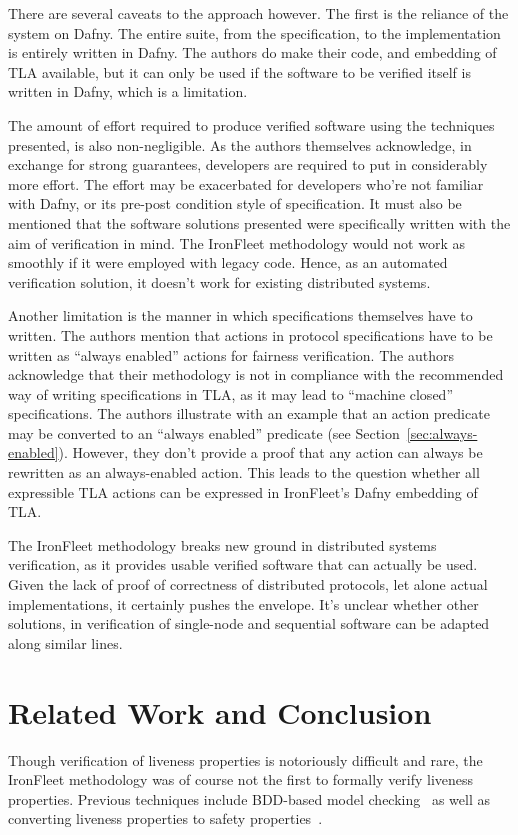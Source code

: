 \documentclass{llncs}
\begin{document}
There are several caveats to the approach however. The first is the reliance of the system on Dafny.
 The entire suite, from the specification, to the implementation is entirely written in Dafny. The 
 authors do make their code, and embedding of TLA available, but it can only be used if the software
 to be verified itself is written in Dafny, which is a limitation. 

 The amount of effort required to produce verified software using the techniques presented, is also 
 non-negligible. As the authors themselves acknowledge, in exchange for strong guarantees, developers
 are required to put in considerably more effort. The effort may be exacerbated for developers who're 
 not familiar with Dafny, or its pre-post condition style of specification. 
 It must also be mentioned that the software solutions presented were specifically written with 
 the aim of verification in mind. The IronFleet methodology would not work as smoothly if it were
 employed with legacy code. Hence, as an automated verification solution, it doesn't work for 
 existing distributed systems. 

 Another limitation is the manner in which specifications themselves have to written. The 
 authors mention that actions in protocol specifications have to be written as ``always enabled''
 actions for fairness verification. The authors acknowledge that their methodology is not 
 in compliance with the recommended way of writing specifications in TLA, as it may lead
 to ``machine closed'' specifications. The authors illustrate with an example that an action
 predicate may be converted to an ``always enabled'' predicate 
 (see Section~\ref{sec:always-enabled}). However, they don't provide a proof that any
 action can always be rewritten as an always-enabled action. This leads to the question
 whether all expressible TLA actions can be expressed in IronFleet's Dafny embedding of TLA.

 The IronFleet methodology breaks new ground in distributed systems verification, as it 
 provides usable verified software that can actually be used. Given the lack of proof of 
 correctness of distributed protocols, let alone actual implementations, it certainly 
 pushes the envelope. It's unclear whether other solutions, in verification of single-node and
 sequential software can be adapted along similar lines.


\section{Related Work and Conclusion}\label{sec:rel-work}
Though verification of liveness properties is notoriously difficult and rare,
the IronFleet methodology was of course not the first to formally verify
liveness properties. Previous techniques include BDD-based model
checking~\cite{Ravi2000} as well as converting liveness properties to safety
properties~\cite{Schuppan2006}.
\end{document}
